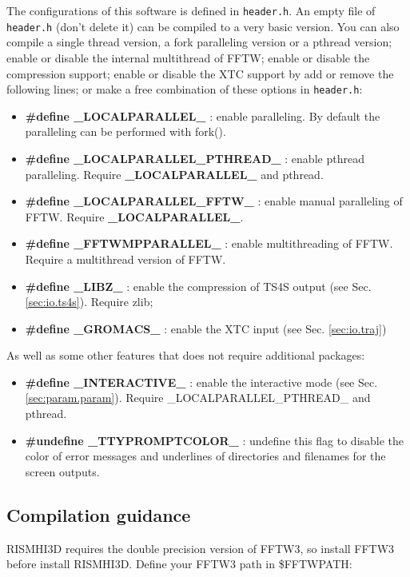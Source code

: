 \documentclass[aip,amsmath,amssymb,reprint,onecolumn]{revtex4-1}
\begin{document}
The configurations of this software is defined in \texttt{header.h}. An empty file of \texttt{header.h} (don't delete it) can be compiled to a very basic version. You can also compile a single thread version, a fork paralleling version or a pthread version; enable or disable the internal multithread of FFTW; enable or disable the compression support; enable or disable the XTC support by add or remove the following lines; or make a free combination of these options in \texttt{header.h}:

\begin{itemize}
    \item {\bf \#define \_LOCALPARALLEL\_} : enable paralleling. By default the paralleling can be performed with fork().
    \item {\bf \#define \_LOCALPARALLEL\_PTHREAD\_} : enable pthread paralleling. Require {\bf \_LOCALPARALLEL\_} and pthread.
    \item {\bf \#define \_LOCALPARALLEL\_FFTW\_} : enable manual paralleling of FFTW. Require {\bf \_LOCALPARALLEL\_}.
    \item {\bf \#define \_FFTWMPPARALLEL\_} : enable multithreading of FFTW. Require a multithread version of FFTW.
    \item {\bf \#define \_LIBZ\_} : enable the compression of TS4S output (see Sec. \ref{sec:io.ts4s}). Require zlib;
    \item {\bf \#define \_GROMACS\_} : enable the XTC input (see Sec. \ref{sec:io.traj})
\end{itemize}

As well as some other features that does not require additional packages:

\begin{itemize}
    \item {\bf \#define \_INTERACTIVE\_} : enable the interactive mode (see Sec. \ref{sec:param.param}). Require \_LOCALPARALLEL\_PTHREAD\_ and pthread.
    \item {\bf \#undefine \_TTYPROMPTCOLOR\_} : undefine this flag to disable the color of error messages and underlines of directories and filenames for the screen outputs.
\end{itemize}

\subsection{Compilation guidance}

RISMHI3D requires the double precision version of FFTW3, so install FFTW3 before install RISMHI3D. Define your FFTW3 path in \$FFTWPATH:
\end{document}
